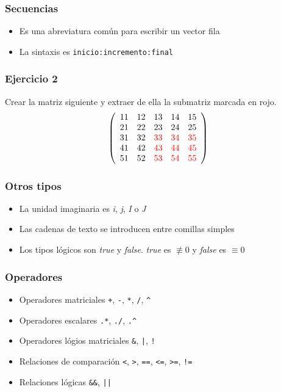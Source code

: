 \documentclass[12pt]{beamer}
\begin{document}
\testcode{
\begin{lstlisting}
\end{lstlisting}
}



\begin{frame}
\frametitle{Secuencias}
\begin{itemize}
\item Es una abreviatura común para escribir un vector fila
\item La sintaxis es \texttt{inicio:incremento:final}
\end{itemize}
\testcode
\end{frame}

\begin{frame}
\frametitle{Ejercicio 2} 
Crear la matriz siguiente y extraer de ella la submatriz marcada en rojo.
\[ \left( \begin{array}{ccccc}
11&12&13&14&15\\
21&22&23&24&25\\
31&32&\textcolor{red}{33}&\textcolor{red}{34}&\textcolor{red}{35}\\
41&42&\textcolor{red}{43}&\textcolor{red}{44}&\textcolor{red}{45}\\
51&52&\textcolor{red}{53}&\textcolor{red}{54}&\textcolor{red}{55}
\end{array} \right) \]
\end{frame}

\begin{frame}
\frametitle{Otros tipos}
\begin{itemize}
\item La unidad imaginaria es \emph{i}, \emph{j}, \emph{I} o \emph{J}
\item Las cadenas de texto se introducen entre comillas simples
\item Los tipos lógicos son \emph{true} y \emph{false}.  \emph{true}
  es $\not \equiv 0$ y \emph{false} es $\equiv 0$
\end{itemize}
\end{frame}

\begin{frame}
\frametitle{Operadores}
\begin{itemize}
\item Operadores matriciales \texttt{+}, \texttt{-}, \texttt{*},
  \texttt{/}, \texttt{\^}
\item Operadores escalares \texttt{.*}, \texttt{./}, \texttt{.\^}
\item Operadores lógios matriciales \texttt{\&}, \texttt{|}, \texttt{!}
\item Relaciones de comparación \texttt{<}, \texttt{>}, \texttt{==},
  \texttt{<=}, \texttt{>=}, \texttt{!=}
\item Relaciones lógicas \texttt{\&\&}, \texttt{||}
\end{itemize}
\end{frame}
\end{document}
